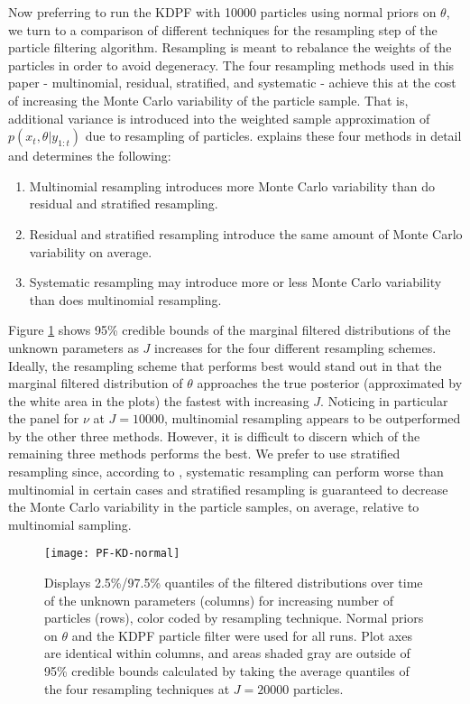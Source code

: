 \documentclass{elsarticle}
\begin{document}
Now preferring to run the KDPF with 10000 particles using normal priors on $\theta$, we turn to a comparison of different techniques for the resampling step of the particle filtering algorithm.  Resampling is meant to rebalance the weights of the particles in order to avoid degeneracy.  The four resampling methods used in this paper - multinomial, residual, stratified, and systematic - achieve this at the cost of increasing the Monte Carlo variability of the particle sample.  That is, additional variance is introduced into the weighted sample approximation of $p(x_t,\theta|y_{1:t})$ due to resampling of particles.  \citet{Douc:Capp:Moul:comp:2005} explains these four methods in detail and determines the following:

\begin{enumerate}
\item Multinomial resampling introduces more Monte Carlo variability than do residual and stratified resampling.
\item Residual and stratified resampling introduce the same amount of Monte Carlo variability on average.
\item Systematic resampling may introduce more or less Monte Carlo variability than does multinomial resampling.
\end{enumerate}

Figure \ref{fig:resamp} shows 95\% credible bounds of the marginal filtered distributions of the unknown parameters as $J$ increases for the four different resampling schemes.  Ideally, the resampling scheme that performs best would stand out in that the marginal filtered distribution of $\theta$ approaches the true posterior (approximated by the white area in the plots) the fastest with increasing $J$.  Noticing in particular the panel for $\nu$ at $J = 10000$, multinomial resampling appears to be outperformed by the other three methods.  However, it is difficult to discern which of the remaining three methods performs the best.  We prefer to use stratified resampling since, according to \cite{Douc:Capp:Moul:comp:2005}, systematic resampling can perform worse than multinomial in certain cases and stratified resampling is guaranteed to decrease the Monte Carlo variability in the particle samples, on average, relative to multinomial sampling.

\begin{figure}
\centering
\texttt{[image: PF-KD-normal]}
\caption{Displays 2.5\%/97.5\% quantiles of the filtered distributions over time of the unknown parameters (columns) for increasing number of particles (rows), color coded by resampling technique.  Normal priors on $\theta$ and the KDPF particle filter were used for all runs.  Plot axes are identical within columns, and areas shaded gray are outside of 95\% credible bounds calculated by taking the average quantiles of the four resampling techniques at $J = 20000$ particles.} \label{fig:resamp}
\end{figure}
\end{document}
